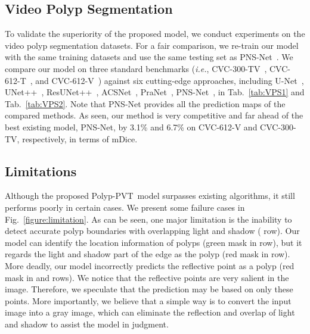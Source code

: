 \documentclass[journal]{IEEEtran}
\newcommand{\tabref}[1]{Tab.~\ref{#1}}
\def\ourmodel{Polyp-PVT}
\begin{document}
\subsection{Video Polyp Segmentation}
To validate the superiority of the proposed model, we conduct experiments on the video polyp segmentation datasets.
For a fair comparison, we re-train our model with the same training datasets and use the same testing set as PNS-Net~\cite{ji2021pnsnet,ji2022video}.
We compare our model on three standard benchmarks (\emph{i.e.}, CVC-300-TV~\cite{bernal2012towards}, CVC-612-T~\cite{bernal2015wm}, and CVC-612-V~\cite{bernal2015wm}) against six cutting-edge approaches, including
U-Net~\cite{ronneberger2015unet}, UNet++~\cite{zhou2018unet++}, ResUNet++~\cite{JhaSRJLHJ19}, ACSNet~\cite{zhang2020ACSN}, PraNet~\cite{fan2020pranet}, PNS-Net~\cite{ji2021pnsnet}, in \tabref{tab:VPS1} and \tabref{tab:VPS2}.
Note that PNS-Net provides all the prediction maps of the compared methods.
As seen, our method is very competitive and far ahead of the best existing model, PNS-Net, by 3.1\% and 6.7\% on CVC-612-V and CVC-300-TV, respectively, in terms of mDice.


\subsection{Limitations}
Although the proposed \ourmodel~model surpasses existing algorithms, it still performs poorly in certain cases. 
We present some failure cases in Fig.~\ref{figure:limitation}.
As can be seen, one major limitation is the inability to detect accurate polyp boundaries with overlapping light and shadow ( row).
Our model can identify the location information of polyps (green mask in  row), but it regards the light and shadow part of the edge as the polyp (red mask in  row). 
More deadly, our model incorrectly predicts the reflective point as a polyp (red mask in  and  rows).
We notice that the reflective points are very salient in the image. 
Therefore, we speculate that the prediction may be based on only these points.
More importantly, we believe that a simple way is to convert the input image into a gray image, which can eliminate the reflection and overlap of light and shadow to assist the model in judgment.
\end{document}
